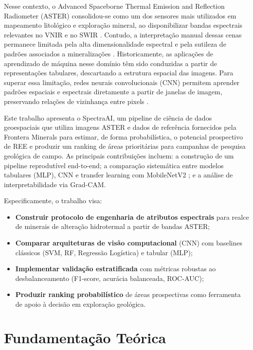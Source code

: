 \documentclass[12pt,twocolumn]{article}
\providecommand{\tightlist}{%
  \setlength{\itemsep}{0pt}\setlength{\parskip}{0pt}}
\begin{document}
Nesse contexto, o Advanced Spaceborne Thermal Emission and Reflection Radiometer (ASTER) consolidou-se como um dos sensores mais utilizados em mapeamento litológico e exploração mineral, ao disponibilizar bandas espectrais relevantes no VNIR e no SWIR \cite{abrams2019, ramsey2020}. Contudo, a interpretação manual dessas cenas permanece limitada pela alta dimensionalidade espectral e pela sutileza de padrões associados a mineralizações \cite{shirmard2022}. Historicamente, as aplicações de aprendizado de máquina nesse domínio têm sido conduzidas a partir de representações tabulares, descartando a estrutura espacial das imagens. Para superar essa limitação, redes neurais convolucionais (CNN) permitem aprender padrões espaciais e espectrais diretamente a partir de janelas de imagem, preservando relações de vizinhança entre pixels \cite{zhu2017}.

Este trabalho apresenta o SpectraAI, um pipeline de ciência de dados geoespaciais que utiliza imagens ASTER e dados de referência fornecidos pela Frontera Minerals para estimar, de forma probabilística, o potencial prospectivo de REE e produzir um ranking de áreas prioritárias para campanhas de pesquisa geológica de campo. As principais contribuições incluem: a construção de um pipeline reprodutível end-to-end; a comparação sistemática entre modelos tabulares (MLP), CNN e transfer learning com MobileNetV2 \cite{sandler2018}; e a análise de interpretabilidade via Grad-CAM.

Especificamente, o trabalho visa:

\begin{itemize}
\tightlist
\item
  \textbf{Construir protocolo de engenharia de atributos espectrais} para realce de minerais de alteração hidrotermal a partir de bandas ASTER;
\item
  \textbf{Comparar arquiteturas de visão computacional} (CNN) com baselines clássicos (SVM, RF, Regressão Logística) e tabular (MLP);
\item
  \textbf{Implementar validação estratificada} com métricas robustas ao desbalanceamento (F1-score, acurácia balanceada, ROC-AUC);
\item
  \textbf{Produzir ranking probabilístico} de áreas prospectivas como ferramenta de apoio à decisão em exploração geológica.
\end{itemize}

\section{Fundamentação Teórica}\label{fundamentauxe7uxe3o-teuxf3rica}
\end{document}
